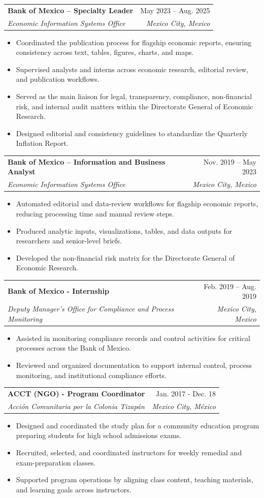 \documentclass[letterpaper,11pt]{article}
\makeatletter
\newcommand{\resumeItem}[1]{
  \item\small{
    {#1 \vspace{-2pt}}
  }
}
\newcommand{\resumeSubheading}[4]{
  \vspace{-2pt}\item
    \begin{tabular*}{0.97\textwidth}[t]{l@{\extracolsep{\fill}}r}
      \textbf{#1} & #2 \\
      \textit{\small#3} & \textit{\small #4} \\
    \end{tabular*}\vspace{-7pt}
}
\newcommand{\resumeItemListStart}{\begin{itemize}}
\newcommand{\resumeItemListEnd}{\end{itemize}\vspace{-5pt}}
\makeatother
\begin{document}
\resumeSubheading
  {Bank of Mexico -- Specialty Leader}{May 2023 -- Aug. 2025}
  {Economic Information Systems Office}{Mexico City, Mexico}
  \resumeItemListStart
    \resumeItem{Coordinated the publication process for flagship economic reports, ensuring consistency across text, tables, figures, charts, and maps.}
    \resumeItem{Supervised analysts and interns across economic research, editorial review, and publication workflows.}
    \resumeItem{Served as the main liaison for legal, transparency, compliance, non-financial risk, and internal audit matters within the Directorate General of Economic Research.}
    \resumeItem{Designed editorial and consistency guidelines to standardize the Quarterly Inflation Report.}
  \resumeItemListEnd

\resumeSubheading
  {Bank of Mexico -- Information and Business Analyst}{Nov. 2019 -- May 2023}
  {Economic Information Systems Office}{Mexico City, Mexico}
  \resumeItemListStart
    \resumeItem{Automated editorial and data-review workflows for flagship economic reports, reducing processing time and manual review steps.}
    \resumeItem{Produced analytic inputs, visualizations, tables, and data outputs for researchers and senior-level briefs.}
    \resumeItem{Developed the non-financial risk matrix for the Directorate General of Economic Research.}
  \resumeItemListEnd

    \resumeSubheading
    {Bank of Mexico - Internship}{Feb. 2019 -- Aug. 2019}
    {Deputy Manager's Office for Compliance and Process Monitoring}{Mexico City, Mexico}
        \resumeItemListStart
        \resumeItem{Assisted in monitoring compliance records and control activities for critical processes across the Bank of Mexico.}
        \resumeItem{Reviewed and organized documentation to support internal control, process monitoring, and institutional compliance efforts.}
    \resumeItemListEnd

    \resumeSubheading
      {ACCT (NGO) - Program Coordinator}{Jan. 2017 - Dec. 18}
      {Acción Comunitaria por la Colonia Tizapán}{Mexico City, México}
        \resumeItemListStart
            \resumeItem{Designed and coordinated the study plan for a community education program preparing students for high school admissions exams.}
            \resumeItem{Recruited, selected, and coordinated instructors for weekly remedial and exam-preparation classes.}
            \resumeItem{Supported program operations by aligning class content, teaching materials, and learning goals across instructors.}
        \resumeItemListEnd
\end{document}
